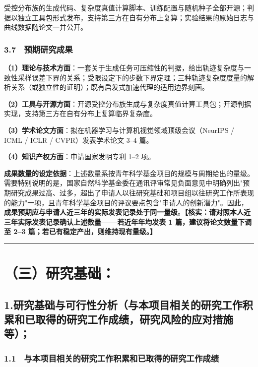 \documentclass[12pt,a4paper]{ctexart}
\begin{document}
受控分布族的生成代码、复杂度真值计算脚本、训练配置与随机种子全部开源；判据以独立工具包形式发布，支持第三方在自有分布上复算；实验结果的原始日志与曲线数据随论文一并公开。

\subsubsection*{3.7　预期研究成果}

\textbf{（1）理论与技术方面}：一套关于生成任务可压缩性的判据，给出轨迹复杂度与一致性采样误差下界的关系；受限设定下的步数下界定理；三种轨迹复杂度度量的解析关系（或独立性的证明）；既有启发式加速代理的适用边界刻画。

\textbf{（2）工具与开源方面}：开源受控分布族生成与复杂度真值计算工具包；开源判据实现，支持第三方在自有分布上复算临界复杂度。

\textbf{（3）学术论文方面}：拟在机器学习与计算机视觉领域顶级会议（NeurIPS / ICML / ICLR / CVPR）发表学术论文 3–4 篇。

\textbf{（4）知识产权方面}：申请国家发明专利 1–2 项。

\textbf{成果数量的设定依据}：上述数量系按青年科学基金项目的规模与周期给出的量级。需要特别说明的是，国家自然科学基金委在通讯评审常见负面意见中明确列出"预期研究成果过高、过多，超出了申请人以往研究基础和项目组以往研究工作所表现的能力"一项，且青年科学基金项目的评议要点包含"申请人的创新潜力"。因此，\textbf{成果预期应与申请人近三年的实际发表记录处于同一量级}。\textbf{【核实：请对照本人近三年实际发表记录确认上述数量——若近年年均发表 1 篇，建议将论文数量下调至 2–3 篇；若已有稳定产出，则维持现有量级。】}

\vspace{4pt}\noindent\rule{\linewidth}{0.4pt}\vspace{4pt}

\section*{（三）研究基础：}

\subsection*{1.研究基础与可行性分析（与本项目相关的研究工作积累和已取得的研究工作成绩，研究风险的应对措施等）；}

\subsubsection*{1.1　与本项目相关的研究工作积累和已取得的研究工作成绩}
\end{document}
